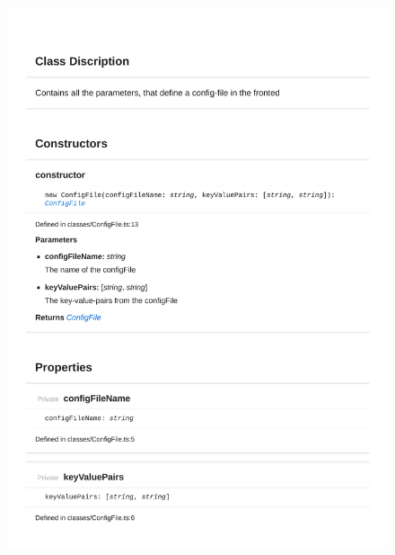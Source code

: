 \begin{figure}[H]
\centerline{\includegraphics[width=1\textwidth]{FrontendDocsAsPDF/Classes/ConfigFile.pdf}}
\end{figure}

